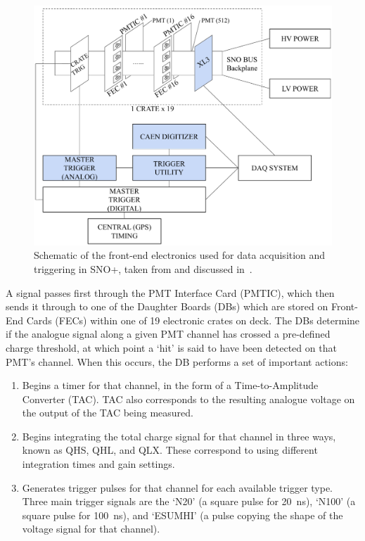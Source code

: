 \begin{figure}
    \centering
    \includegraphics[width=0.7\linewidth]{2_Detector/Figs/electronics_diagram.pdf}
    \caption[Schematic of the front-end electronics used for data acquisition and triggering in SNO+]{Schematic of the front-end electronics used for data acquisition and triggering in SNO+, taken from and discussed in~\cite{albaneseSNOExperiment2021}. %
    }
    \label{fig:tdaq_schematic}
\end{figure}

A signal passes first through the PMT Interface Card (PMTIC), which then sends it through to one of the Daughter Boards (DBs) which are stored on Front-End Cards (FECs) within one of 19 electronic crates on deck. The DBs determine if the analogue signal along a given PMT channel has crossed a pre-defined charge threshold, at which point a `hit' is said to have been detected on that PMT's channel. When this occurs, the DB performs a set of important actions:
\begin{enumerate}
    \item Begins a timer for that channel, in the form of a Time-to-Amplitude Converter (TAC). TAC also corresponds to the resulting analogue voltage on the output of the TAC being measured.
    \item Begins integrating the total charge signal for that channel in three ways, known as QHS, QHL, and QLX. These correspond to using different integration times and gain settings.
    \item Generates trigger pulses for that channel for each available trigger type. Three main trigger signals are the `N20' (a square pulse for \SI{20}{\ns}), `N100' (a square pulse for \SI{100}{\ns}), and `ESUMHI' (a pulse copying the shape of the voltage signal for that channel).
\end{enumerate}

